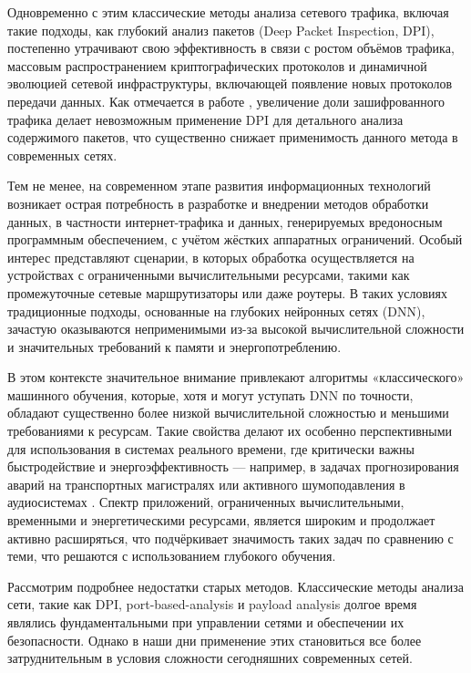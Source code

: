 Одновременно с этим классические методы анализа сетевого трафика, включая такие подходы, как глубокий анализ пакетов (Deep Packet Inspection, DPI), постепенно утрачивают свою эффективность в связи с ростом объёмов трафика, массовым распространением криптографических протоколов и динамичной эволюцией сетевой инфраструктуры, включающей появление новых протоколов передачи данных. Как отмечается в работе \cite{Sherry2015}, увеличение доли зашифрованного трафика делает невозможным применение DPI для детального анализа содержимого пакетов, что существенно снижает применимость данного метода в современных сетях.

Тем не менее, на современном этапе развития информационных технологий возникает острая потребность в разработке и внедрении методов обработки данных, в частности интернет-трафика и данных, генерируемых вредоносным программным обеспечением, с учётом жёстких аппаратных ограничений. Особый интерес представляют сценарии, в которых обработка осуществляется на устройствах с ограниченными вычислительными ресурсами, такими как промежуточные сетевые маршрутизаторы или даже роутеры. В таких условиях традиционные подходы, основанные на глубоких нейронных сетях (DNN), зачастую оказываются неприменимыми из-за высокой вычислительной сложности и значительных требований к памяти и энергопотреблению.

В этом контексте значительное внимание привлекают алгоритмы «классического» машинного обучения, которые, хотя и могут уступать DNN по точности, обладают существенно более низкой вычислительной сложностью и меньшими требованиями к ресурсам. Такие свойства делают их особенно перспективными для использования в системах реального времени, где критически важны быстродействие и энергоэффективность — например, в задачах прогнозирования аварий на транспортных магистралях \cite{Athanasios2019} или активного шумоподавления в аудиосистемах \cite{Xiao2018}. Спектр приложений, ограниченных вычислительными, временными и энергетическими ресурсами, является широким и продолжает активно расширяться, что подчёркивает значимость таких задач по сравнению с теми, что решаются с использованием глубокого обучения.


Рассмотрим подробнее недостатки старых методов. Классические методы анализа сети, такие как DPI, port-based-analysis и payload analysis долгое время являлись фундаментальными при управлении сетями и обеспечении их безопасности. Однако в наши дни применение этих становиться все более затруднительным в условия сложности сегодняшних современных сетей.
\cite{Hou2020, Lin2014}

